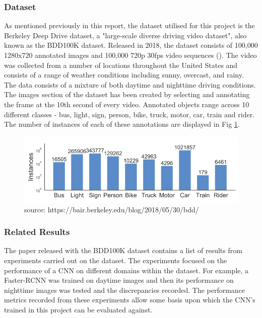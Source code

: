 \documentclass[12pt]{report}
\begin{document}
\subsubsection{Dataset}
\begin{flushleft}
As mentioned previously in this report, the dataset utilised for this project is the Berkeley Deep Drive dataset, a "large-scale diverse driving video dataset", also known as the BDD100K dataset. Released in 2018, the dataset consists of 100,000 1280x720 annotated images and 100,000 720p 30fps video sequences (\cite{yu2018bdd100k}). The video was collected from a number of locations throughout the United States and consists of a range of weather conditions including sunny, overcast, and rainy. The data consists of a mixture of both daytime and nighttime driving conditions. The images section of the dataset has been created by selecting and annotating the frame at the 10th second of every video. Annotated objects range across 10 different classes - bus, light, sign, person, bike, truck, motor, car, train and rider. The number of instances of each of these annotations are displayed in Fig \ref{fig:annotations}.
\end{flushleft}

\vspace{0.5cm}
\begin{figure}[ht!]
	\centering
	\includegraphics[width=12cm]{annotations}
	\caption{source: https://bair.berkeley.edu/blog/2018/05/30/bdd/}
	\label{fig:annotations}
\end{figure}

\subsubsection{Related Results}
\begin{flushleft}
The paper released with the BDD100K dataset contains a list of results from experiments carried out on the dataset. The experiments focused on the performance of a CNN on different domains within the dataset. For example, a Faster-RCNN was trained on daytime images and then its performance on nighttime images was tested and the discrepancies recorded. The performance metrics recorded from these experiments allow some basis upon which the CNN's trained in this project can be evaluated against.
\end{flushleft}
\end{document}
